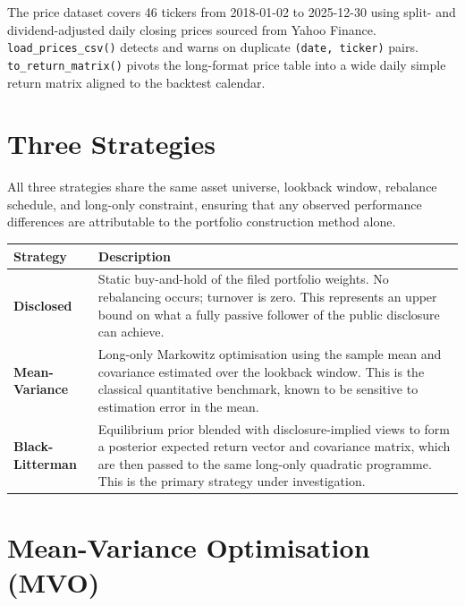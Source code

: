 \documentclass[11pt, a4paper]{article}
\newcommand{\code}[1]{\texttt{#1}}
\begin{document}
The price dataset covers 46 tickers from 2018-01-02 to 2025-12-30 using
split- and dividend-adjusted daily closing prices sourced from Yahoo Finance.
\code{load\_prices\_csv()} detects and warns on duplicate \code{(date, ticker)}
pairs. \code{to\_return\_matrix()} pivots the long-format price table into
a wide daily simple return matrix aligned to the backtest calendar.

\section{Three Strategies}

All three strategies share the same asset universe, lookback window, rebalance
schedule, and long-only constraint, ensuring that any observed performance
differences are attributable to the portfolio construction method alone.

\medskip
\begin{center}
\begin{tabular}{@{}L{2.8cm} L{10cm}@{}}
  \toprule
  \textbf{Strategy} & \textbf{Description} \\
  \midrule
  \textbf{Disclosed} &
    Static buy-and-hold of the filed portfolio weights. No rebalancing occurs;
    turnover is zero. This represents an upper bound on what a fully passive
    follower of the public disclosure can achieve. \\[6pt]
  \textbf{Mean-Variance} &
    Long-only Markowitz optimisation using the sample mean and covariance
    estimated over the lookback window. This is the classical quantitative
    benchmark, known to be sensitive to estimation error in the mean. \\[6pt]
  \textbf{Black-Litterman} &
    Equilibrium prior blended with disclosure-implied views to form a
    posterior expected return vector and covariance matrix, which are then
    passed to the same long-only quadratic programme. This is the primary
    strategy under investigation. \\
  \bottomrule
\end{tabular}
\end{center}

\section{Mean-Variance Optimisation (MVO)}
\end{document}
